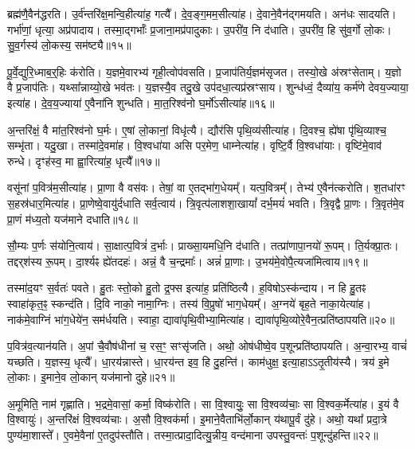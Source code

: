 ब्रह्म॑णै॒वैन॑द्धरति।
उ॒र्व॑न्तरि॑क्ष॒मन्वि॒हीत्या॑ह॒ गत्यै᳚।
दे॒व॒ङ्ग॒मम॒सी\-त्या॑ह।
दे॒वाने॒वैन॑द्गमयति।
अन॑धः सादयति।
गर्भा॑णां॒ धृत्या॒ अप्र॑पादाय।
तस्मा॒द्गर्भाः᳚ प्र॒जाना॒मप्र॑पादुकाः।
उ॒परी॑व॒ नि द॑धाति।
उ॒परी॑व॒ हि सु॑व॒र्गो लो॒कः।
सु॒व॒र्गस्य॑ लो॒कस्य॒ सम॑ष्ट्यै॥१५॥\anuvakamend[स॒यो॒नि॒त्वाय॑ स्व॒धाकृ॑ता॒\-ऽसीत्या॑ह दाया॒द्वेद॑ भरति जायन्ते॒ बृह॒स्पतिः॒ सम॑ष्ट्यै]

पू॒र्वे॒द्युरि॒ध्माब॒र्॒हिः क॑रोति।
य॒ज्ञमे॒वारभ्य॑ गृही॒त्वोप॑वसति।
प्र॒जा\-प॑तिर्य॒ज्ञम॑\-सृजत।
तस्यो॒खे अ॑स्रꣳसेताम्।
य॒ज्ञो वै प्र॒जा\-प॑तिः।
यथ्सा᳚न्नाय्यो॒खे भव॑तः।
य॒ज्ञस्यै॒व तदु॒खे उप॑दधा॒त्यप्र॑स्रꣳसाय।
शुन्ध॑ध्वं॒ दैव्या॑य॒ कर्म॑णे देवय॒ज्याया॒ इत्या॑ह।
दे॒व॒य॒ज्याया॑ ए॒वैना॑नि शुन्धति।
मा॒त॒रिश्व॑नो घ॒र्मो॑\-ऽसीत्या॑ह॥१६॥

अ॒न्तरि॑क्षं॒ वै मा॑त॒रिश्व॑नो घ॒र्मः।
ए॒षां लो॒कानां॒ विधृ॑त्यै।
द्यौर॑सि पृथि॒व्य॑सीत्या॑ह।
दि॒वश्च॒ ह्ये॑षा पृ॑थि॒व्याश्च॒ सम्भृ॑ता।
यदु॒खा।
तस्मा॑दे॒वमा॑ह।
वि॒श्वधा॑या असि पर॒मेण॒ धाम्नेत्या॑ह।
वृष्टि॒र्वै वि॒श्वधा॑याः।
वृष्टि॑मे॒वाव॑ रुन्धे।
दृꣳह॑स्व॒ मा ह्वा॒रित्या॑ह॒ धृत्यै᳚॥१७॥

वसू॑नां प॒वित्र॑म॒सीत्या॑ह।
प्रा॒णा वै वस॑वः।
तेषां॒ वा ए॒तद्भा॑ग॒धेयम्᳚।
यत्प॒वित्रम्᳚।
तेभ्य॑ ए॒वैन॑त्करोति।
श॒तधा॑रꣳ स॒हस्र॑धार॒मित्या॑ह।
प्रा॒णेष्वे॒वायु॑र्दधाति सर्व॒त्वाय॑।
त्रि॒वृत्प॑लाश\-शा॒खायां᳚ दर्भ॒मयं॑ भवति।
त्रि॒वृद्वै प्रा॒णः।
त्रि॒वृत॑मे॒व प्रा॒णं म॑ध्य॒तो यज॑माने दधाति॥१८॥

सौ॒म्यः प॒र्णः स॑योनि॒त्वाय॑।
सा॒क्षात्प॒वित्रं॑ द॒र्भाः।
प्राख्सा॒यमधि॒नि द॑धाति।
तत्प्रा॑णापा॒नयो॑ रू॒पम्।
ति॒र्यक्प्रा॒तः।
तद्दर्‌श॑स्य रू॒पम्।
दा॒र्श्यꣴ ह्ये॑तदहः॑।
अन्नं॒ वै च॒न्द्रमाः᳚।
अन्नं॑ प्रा॒णाः।
उ॒भय॑मे॒वोपै॒त्यजा॑मित्वाय॥१९॥

तस्मा॑द॒यꣳ स॒र्वतः॑ पवते।
हु॒तः स्तो॒को हु॒तो द्र॒फ्स इत्या॑ह॒ प्रति॑\-ष्ठित्यै।
ह॒विषो\-ऽस्क॑न्दाय।
न हि हु॒तꣴ स्वाहा॑कृत॒ꣴ॒ स्कन्द॑ति।
दि॒वि नाको॒ नामा॒ग्निः।
तस्य॑ वि॒प्रुषो॑ भाग॒धेयम्᳚।
अ॒ग्नये॑ बृह॒ते नाका॒येत्या॑ह।
नाक॑मे॒वाग्निं भा॑ग॒धेये॑न॒ सम॑र्धयति।
स्वाहा॒ द्यावा॑पृथि॒वीभ्या॒मित्या॑ह।
द्यावा॑पृथि॒व्योरे॒वैन॒त्प्रति॑\-ष्ठापयति॥२०॥

प॒वित्र॑व॒त्यान॑यति।
अ॒पां चै॒वौष॑धीनां च॒ रस॒ꣳ॒ सꣳसृ॑जति।
अथो॒ ओष॑धीष्वे॒व प॒शून्प्रति॑\-ष्ठापयति।
अ॒न्वा॒रभ्य॒ वाचं॑ यच्छति।
य॒ज्ञस्य॒ धृत्यै᳚।
धा॒रय॑न्नास्ते।
धा॒रय॑न्त इव॒ हि दु॒हन्ति॑।
काम॑धुक्ष॒ इत्या॒हाऽऽतृ॒तीय॑स्यै।
त्रय॑ इ॒मे लो॒काः।
इ॒माने॒व लो॒कान् ‌यज॑मानो दुहे॥२१॥

अ॒मूमिति॒ नाम॑ गृह्णाति।
भ॒द्रमे॒वासां॒ कर्मा॒ विष्क॑रोति।
सा वि॒श्वायुः॒ सा वि॒श्वव्य॑चाः॒ सा वि॒श्वक॒र्मेत्या॑ह।
इ॒यं वै वि॒श्वायुः॑।
अ॒न्तरि॑क्षं वि॒श्वव्य॑चाः।
अ॒सौ वि॒श्वक॑र्मा।
इ॒माने॒वैताभि॑र्लो॒कान्‌ य॑थापू॒र्वं दु॑हे।
अथो॒ यथा᳚ प्रदा॒त्रे पुण्य॑मा॒शास्ते᳚।
ए॒वमे॒वैना॑ ए॒तदुप॑स्तौति।
तस्मा॒त्प्रादा॒दित्यु॒न्नीय॒ वन्द॑माना उपस्तु॒वन्तः॑ प॒शून्दु॑\-हन्ति॥२२॥

